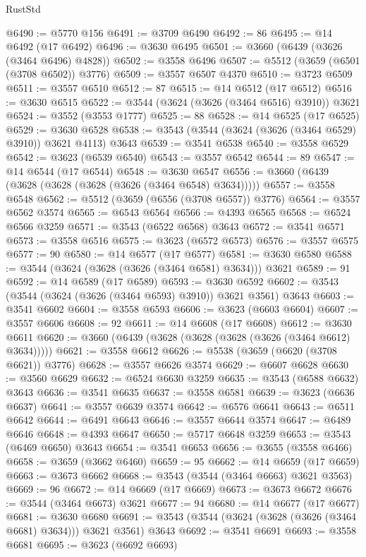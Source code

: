 \begin{lexlean}{RustStd}
\begin{coremodule}
@6490 := @5770 @156
@6491 := @3709 @6490
@6492 := 86
@6495 := @14 @6492 (@17 @6492)
@6496 := @3630 @6495
@6501 := @3660 (@6439 (@3626 (@3464 @6496) @4828))
@6502 := @3558 @6496
@6507 := @5512 (@3659 (@6501 (@3708 @6502)) @3776)
@6509 := @3557 @6507 @4370
@6510 := @3723 @6509
@6511 := @3557 @6510
@6512 := 87
@6515 := @14 @6512 (@17 @6512)
@6516 := @3630 @6515
@6522 := @3544 (@3624 (@3626 (@3464 @6516) @3910)) @3621
@6524 := @3552 (@3553 @1777)
@6525 := 88
@6528 := @14 @6525 (@17 @6525)
@6529 := @3630 @6528
@6538 := @3543 (@3544 (@3624 (@3626 (@3464 @6529) @3910)) @3621 @4113) @3643
@6539 := @3541 @6538
@6540 := @3558 @6529
@6542 := @3623 (@6539 @6540)
@6543 := @3557 @6542
@6544 := 89
@6547 := @14 @6544 (@17 @6544)
@6548 := @3630 @6547
@6556 := @3660 (@6439 (@3628 (@3628 (@3628 (@3626 (@3464 @6548) @3634)))))
@6557 := @3558 @6548
@6562 := @5512 (@3659 (@6556 (@3708 @6557)) @3776)
@6564 := @3557 @6562 @3574
@6565 := @6543 @6564
@6566 := @4393 @6565
@6568 := @6524 @6566 @3259
@6571 := @3543 (@6522 @6568) @3643
@6572 := @3541 @6571
@6573 := @3558 @6516
@6575 := @3623 (@6572 @6573)
@6576 := @3557 @6575
@6577 := 90
@6580 := @14 @6577 (@17 @6577)
@6581 := @3630 @6580
@6588 := @3544 (@3624 (@3628 (@3626 (@3464 @6581) @3634))) @3621
@6589 := 91
@6592 := @14 @6589 (@17 @6589)
@6593 := @3630 @6592
@6602 := @3543 (@3544 (@3624 (@3626 (@3464 @6593) @3910)) @3621 @3561) @3643
@6603 := @3541 @6602
@6604 := @3558 @6593
@6606 := @3623 (@6603 @6604)
@6607 := @3557 @6606
@6608 := 92
@6611 := @14 @6608 (@17 @6608)
@6612 := @3630 @6611
@6620 := @3660 (@6439 (@3628 (@3628 (@3628 (@3626 (@3464 @6612) @3634)))))
@6621 := @3558 @6612
@6626 := @5538 (@3659 (@6620 (@3708 @6621)) @3776)
@6628 := @3557 @6626 @3574
@6629 := @6607 @6628
@6630 := @3560 @6629
@6632 := @6524 @6630 @3259
@6635 := @3543 (@6588 @6632) @3643
@6636 := @3541 @6635
@6637 := @3558 @6581
@6639 := @3623 (@6636 @6637)
@6641 := @3557 @6639 @3574
@6642 := @6576 @6641
@6643 := @6511 @6642
@6644 := @6491 @6643
@6646 := @3557 @6644 @3574
@6647 := @6489 @6646
@6648 := @4393 @6647
@6650 := @5717 @6648 @3259
@6653 := @3543 (@6469 @6650) @3643
@6654 := @3541 @6653
@6656 := @3655 (@3558 @6466)
@6658 := @3659 (@3662 @6460)
@6659 := 95
@6662 := @14 @6659 (@17 @6659)
@6663 := @3673 @6662
@6668 := @3543 (@3544 (@3464 @6663) @3621 @3563)
@6669 := 96
@6672 := @14 @6669 (@17 @6669)
@6673 := @3673 @6672
@6676 := @3544 (@3464 @6673) @3621
@6677 := 94
@6680 := @14 @6677 (@17 @6677)
@6681 := @3630 @6680
@6691 := @3543 (@3544 (@3624 (@3628 (@3626 (@3464 @6681) @3634))) @3621 @3561) @3643
@6692 := @3541 @6691
@6693 := @3558 @6681
@6695 := @3623 (@6692 @6693)

\end{coremodule}
\end{lexlean}
